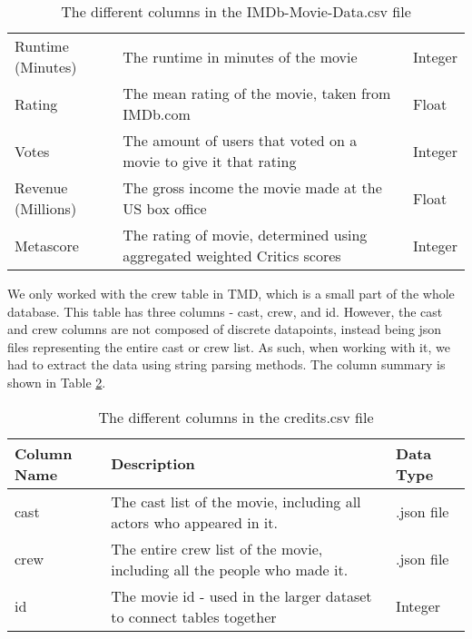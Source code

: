 \begin{table}[h]
\begin{tabular}{lp{10cm}l}
                Runtime (Minutes)  & The runtime in minutes of the movie                                        & Integer   \\
                Rating             & The mean rating of the movie, taken from IMDb.com                          & Float     \\
                Votes              & The amount of users that voted on a movie to give it that rating           & Integer   \\
                Revenue (Millions) & The gross income the movie made at the US box office                       & Float     \\
                Metascore          & The rating of movie, determined using aggregated weighted Critics scores   & Integer   \\
                \bottomrule
            \end{tabular}
            \caption[short]{The different columns in the IMDb-Movie-Data.csv file}\label{tab-IMDb-Movie-Data-Column-Description}
        \end{table}

        We only worked with the crew table in TMD, which is a small part of the whole
            database.
        This table has three columns - cast, crew, and id.
        However, the cast and crew columns are not composed of discrete datapoints,
            instead being json files representing the entire cast or crew list.
        As such, when working with it, we had to extract the data using string parsing
            methods.
        The column summary is shown in Table \ref{tab-Credits-Column-Description}.
        \begin{table}[h]
            \centering
            \begin{tabular}{lp{10cm}l}
                \toprule
                Column Name & Description                                                              & Data Type  \\
                \midrule
                cast        & The cast list of the movie, including all actors who appeared in it.     & .json file \\
                crew        & The entire crew list of the movie, including all the people who made it. & .json file \\
                id          & The movie id - used in the larger dataset to connect tables together     & Integer    \\
                \bottomrule
            \end{tabular}
            \caption[short]{The different columns in the credits.csv file}\label{tab-Credits-Column-Description}
        \end{table}

